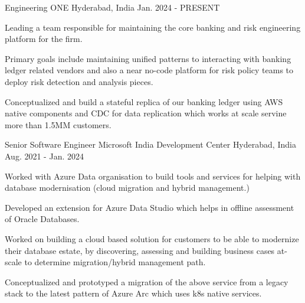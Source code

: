


\begin{cventries}

\cventry
    {Engineering} %
    {ONE} %
    {Hyderabad, India} %
    {Jan. 2024 - PRESENT} %
    {
      \begin{cvitems} %
        \item {Leading a team responsible for maintaining the core banking and risk engineering platform for the firm.}
        \item {Primary goals include maintaining unified patterns to interacting with banking ledger related vendors and also a near no-code platform for risk policy teams to deploy risk detection and analysis pieces.}
        \item {Conceptualized and build a stateful replica of our banking ledger using AWS native components and CDC for data replication which works at scale servine more than 1.5MM customers.}
      \end{cvitems}
    }

\cventry
    {Senior Software Engineer} %
    {Microsoft India Development Center} %
    {Hyderabad, India} %
    {Aug. 2021 - Jan. 2024} %
    {
      \begin{cvitems} %
        \item {Worked with Azure Data organisation to build tools and services for helping with database modernisation (cloud migration and hybrid management.)}
        \item {Developed an extension for Azure Data Studio which helps in offline assessment of Oracle Databases.}
        \item {Worked on building a cloud based solution for customers to be able to modernize their database estate, by discovering, assessing and building business cases at-scale to determine migration/hybrid management path.}
        \item {Conceptualized and prototyped a migration of the above service from a legacy stack to the latest pattern of Azure Arc which uses k8s native services.}
      \end{cvitems}
    }


\end{cventries}
